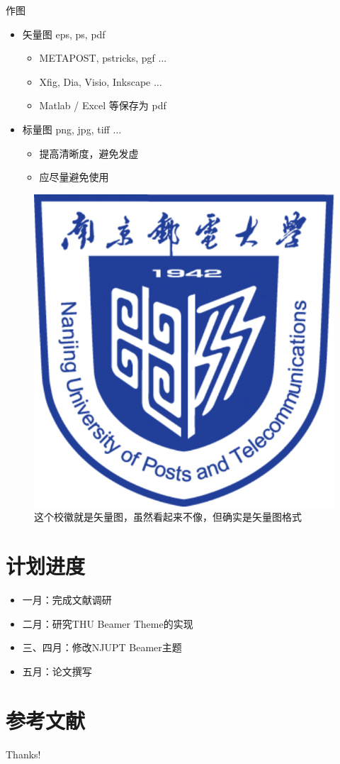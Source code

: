\documentclass[10pt,aspectratio=43]{beamer}
\begin{document}
\begin{frame}{作图}
    \begin{itemize}
        \item 矢量图 eps, ps, pdf
        \begin{itemize}
            \item METAPOST, pstricks, pgf $\ldots$
            \item Xfig, Dia, Visio, Inkscape $\ldots$
            \item Matlab / Excel 等保存为 pdf
        \end{itemize}
        \item 标量图 png, jpg, tiff $\ldots$
        \begin{itemize}
            \item 提高清晰度，避免发虚
            \item 应尽量避免使用
        \end{itemize}
    \end{itemize}
    \begin{figure}[htpb]
        \centering
        \includegraphics[width=0.2\linewidth]{pic/NJUPT_Logo.pdf
        }
        \caption{这个校徽就是矢量图，虽然看起来不像，但确实是矢量图格式}
    \end{figure}
\end{frame}

\section{计划进度}
\begin{frame}
    \begin{itemize}
        \item 一月：完成文献调研
        \item 二月：研究THU Beamer Theme的实现
        \item 三、四月：修改NJUPT Beamer主题
        \item 五月：论文撰写
    \end{itemize}
\end{frame}

\section{参考文献}

\begin{frame}[allowframebreaks]
    
    
\end{frame}

\begin{frame}
    \begin{center}
        {\Huge Thanks!}
    \end{center}
\end{frame}
\end{document}
